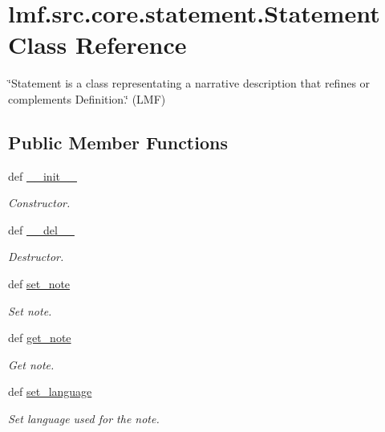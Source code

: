 \hypertarget{classlmf_1_1src_1_1core_1_1statement_1_1_statement}{\section{lmf.\+src.\+core.\+statement.\+Statement Class Reference}
\label{classlmf_1_1src_1_1core_1_1statement_1_1_statement}
}


\char`\"{}\+Statement is a class representating a narrative description that refines or complements Definition.\char`\"{} (L\+M\+F)  


\subsection*{Public Member Functions}
\begin{DoxyCompactItemize}
\item 
def \hyperlink{classlmf_1_1src_1_1core_1_1statement_1_1_statement_ace7d3a3325c7f7b255a3dd72b20c74b1}{\+\_\+\+\_\+init\+\_\+\+\_\+}
\begin{DoxyCompactList}\small\item\em Constructor. \end{DoxyCompactList}\item 
def \hyperlink{classlmf_1_1src_1_1core_1_1statement_1_1_statement_a49d77869667dfde6c6abc794201f9fc3}{\+\_\+\+\_\+del\+\_\+\+\_\+}
\begin{DoxyCompactList}\small\item\em Destructor. \end{DoxyCompactList}\item 
def \hyperlink{classlmf_1_1src_1_1core_1_1statement_1_1_statement_ac5f19645e137199d8a35ed7ddbf4b280}{set\+\_\+note}
\begin{DoxyCompactList}\small\item\em Set note. \end{DoxyCompactList}\item 
def \hyperlink{classlmf_1_1src_1_1core_1_1statement_1_1_statement_a2fb4b0e5e1a60fc1c64a568f23836365}{get\+\_\+note}
\begin{DoxyCompactList}\small\item\em Get note. \end{DoxyCompactList}\item 
def \hyperlink{classlmf_1_1src_1_1core_1_1statement_1_1_statement_aba967f0f44c48614ef275b43729a65a0}{set\+\_\+language}
\begin{DoxyCompactList}\small\item\em Set language used for the note. \end{DoxyCompactList}\item 

\end{DoxyCompactItemize}
